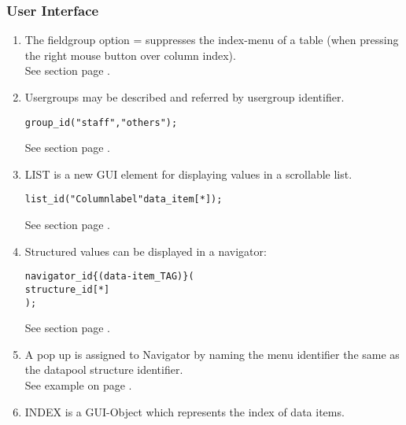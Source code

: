 \subsubsection{User Interface}
\begin{enumerate}
\item The fieldgroup option \MENU=\HIDDEN{} suppresses the index-menu of a table 
(when pressing the right mouse button over column index). \\
See section  page \pageref{sec:uifieldgroupotions}. \\
\item Usergroups may be described and referred by usergroup identifier. \\

\begin{boxedminipage}[t]{\linewidth}
\begin{alltt}
\USERGROUPS group_id ( "staff","others" );
\end{alltt}
\end{boxedminipage}

See section  page \pageref{sec:usergroups}. \\
\item LIST is a new GUI element for displaying values in
a scrollable list.

\begin{boxedminipage}[t]{\linewidth}
\begin{alltt}
  \LIST list_id ( "Column label" data_item[*] );
\end{alltt}
\end{boxedminipage}

See section  page \pageref{sec:uilist}. \\
\item Structured values can be displayed in a navigator:

\begin{boxedminipage}[t]{\linewidth}
\begin{alltt}
  \NAVIGATOR navigator\_id \{\COL (data-item\_TAG)\} (
                         structure\_id[*] 
  );
\end{alltt}
\end{boxedminipage}

See section  page \pageref{sec:uinavigator}. \\
\item A pop up \MENU{} is assigned to Navigator by naming the menu identifier 
the same as the datapool structure identifier. \\
See example on page \pageref{navigatordragndrop}. \\
\item INDEX is a GUI-Object which represents the index of data items. \\


\end{enumerate}
